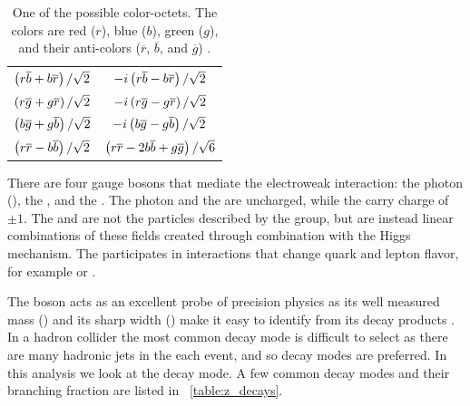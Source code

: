 \begin{table}[h]
\centering
{}
\begin{center}
    \begin{tabular}{c  c}
        $\left( r \overline{b} + b \overline{r} \right) / \sqrt{2}$ &
        $-i \left( r \overline{b} - b \overline{r} \right) / \sqrt{2}$ \\
        $\left( r \overline{g} + g \overline{r} \right) / \sqrt{2}$ &
        $-i \left( r \overline{g} - g \overline{r} \right) / \sqrt{2}$ \\
        $\left( b \overline{g} + g \overline{b} \right) / \sqrt{2}$ &
        $-i \left( b \overline{g} - g \overline{b} \right) / \sqrt{2}$ \\
        $\left( r \overline{r} - b \overline{b} \right) / \sqrt{2}$ &
        $\left( r \overline{r} - 2b \overline{b} + g \overline{g} \right) / \sqrt{6}$ \\
    \end{tabular}
    \caption[
        One possible QCD color-octet.
    ]{
        One of the possible color-octets. The colors are red ($r$), blue ($b$),
        green ($g$), and their anti-colors ($\overline{r}$, $\overline{b}$, and
        $\overline{g}$) .
    }
\label{table:gluon_color}
\end{center}
\end{table}

There are four gauge bosons that mediate the electroweak interaction: the photon
(\photon), the \Z, and the \Wpm. The photon and the \Z are uncharged, while the
\Wpm carry charge of $\pm1$. The \W and \Z are not the particles described by
the \SUtwoUone group, but are instead linear combinations of these fields
created through combination with the Higgs mechanism. The \W participates in
interactions that change quark and lepton flavor, for example \ttoWb or
\mutoWnu.

The \Z boson acts as an excellent probe of precision physics as its well
measured mass (\Zmass) and its sharp width (\Zwidth) make it easy to identify
from its decay products \cite{pdg2014}. In a hadron collider the most common
\Ztoqq decay mode is difficult to select as there are many hadronic jets in the
each event, and so \Ztoll decay modes are preferred. In this analysis we look
at the \Ztoee decay mode. A few common decay modes and their branching fraction
are listed in \TAB~\ref{table:z_decays}.


